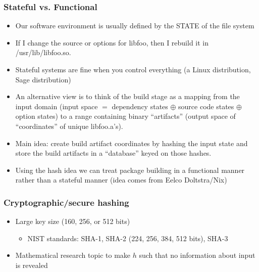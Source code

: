 \documentclass[sans,mathserif]{beamer}
\begin{document}
\begin{frame}
\frametitle{Stateful vs. Functional}
\begin{itemize}
\item<+-> Our software environment is usually defined by the STATE of the file system
\item<+-> If I change the source or options for libfoo, then I rebuild
  it in /usr/lib/libfoo.so.
\item<+-> Stateful systems are fine when you control everything (a
  Linux distribution, Sage distribution)
\item<+-> An alternative view is to think of the build stage as a
  mapping from the input domain (input space $=$ dependency states  $\oplus$ source code states $\oplus$ option states) to a range
  containing binary ``artifacts'' (output space of ``coordinates'' of unique libfoo.a's).
\item<+-> Main idea: create build artifact coordinates by hashing the input state and store the build artifacts in a ``database'' keyed on those hashes.
\item<+-> Using the hash idea we can treat package building in a functional manner rather than a stateful manner (idea comes from Eelco Doltstra/Nix)
\end{itemize}
\end{frame}

\begin{frame}
  \frametitle{Cryptographic/secure hashing}

  \begin{itemize}
  \item<+-> Large key size (160, 256, or 512 bits)
    \begin{itemize}
    \item NIST standards: SHA-1, SHA-2 (224, 256, 384, 512 bits), SHA-3
    \end{itemize}
  \item<+-> Mathematical research topic to make $h$ such that no
    information about input is revealed
  \end{itemize}

~



\end{frame}
\end{document}
